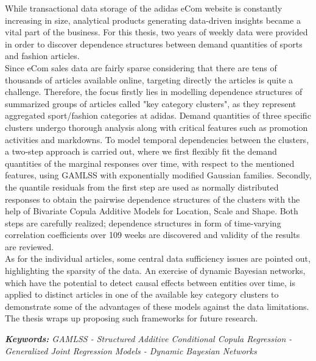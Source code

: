 



While transactional data storage of the adidas eCom website is constantly increasing in size, analytical products generating data-driven insights became a vital part of the business. For this thesis, two years of weekly data were provided in order to discover dependence structures between demand quantities of sports and fashion articles.
\\

Since eCom sales data are fairly sparse considering that there are tens of thousands of articles available online, targeting directly the articles is quite a challenge. Therefore, the focus firstly lies in modelling dependence structures of summarized groups of articles called "key category clusters", as they represent aggregated sport/fashion categories at adidas. Demand quantities of three specific clusters undergo thorough analysis along with critical features such as promotion activities and markdowns. To model temporal dependencies between the clusters, a two-step approach is carried out, where we first flexibly fit the demand quantities of the marginal responses over time, with respect to the mentioned features, using GAMLSS with exponentially modified Gaussian families. Secondly, the quantile residuals from the first step are used as normally distributed responses to obtain the pairwise dependence structures of the clusters with the help of Bivariate Copula Additive Models for Location, Scale and Shape. Both steps are carefully realized; dependence structures in form of time-varying correlation coefficients over 109 weeks are discovered and validity of the results are reviewed.
\\

As for the individual articles, some central data sufficiency issues are pointed out, highlighting the sparsity of the data. An exercise of dynamic Bayesian networks, which have the potential to detect causal effects between entities over time, is applied to distinct articles in one of the available key category clusters to demonstrate some of the advantages of these models against the data limitations. The thesis wraps up proposing such frameworks for future research.


\vspace{1cm}

\textit{\textbf{Keywords:} GAMLSS - Structured Additive Conditional Copula Regression - Generalized Joint Regression Models - Dynamic Bayesian Networks}


